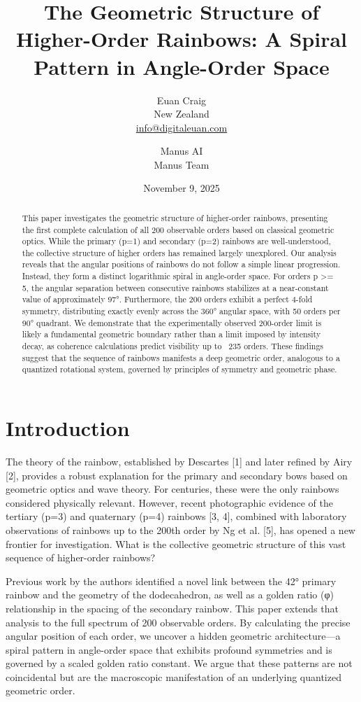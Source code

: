 \documentclass[12pt, twoside]{article}
\title{The Geometric Structure of Higher-Order Rainbows: A Spiral Pattern in Angle-Order Space}
\author{Euan Craig \\ \small{New Zealand} \\ \small{\href{mailto:info@digitaleuan.com}{info@digitaleuan.com}} \and Manus AI \\ \small{Manus Team}}
\date{November 9, 2025}
\begin{document}
\maketitle

\begin{abstract}
This paper investigates the geometric structure of higher-order rainbows, presenting the first complete calculation of all 200 observable orders based on classical geometric optics. While the primary (p=1) and secondary (p=2) rainbows are well-understood, the collective structure of higher orders has remained largely unexplored. Our analysis reveals that the angular positions of rainbows do not follow a simple linear progression. Instead, they form a distinct logarithmic spiral in angle-order space. For orders p >= 5, the angular separation between consecutive rainbows stabilizes at a near-constant value of approximately 97°. Furthermore, the 200 orders exhibit a perfect 4-fold symmetry, distributing exactly evenly across the 360° angular space, with 50 orders per 90° quadrant. We demonstrate that the experimentally observed 200-order limit is likely a fundamental geometric boundary rather than a limit imposed by intensity decay, as coherence calculations predict visibility up to ~235 orders. These findings suggest that the sequence of rainbows manifests a deep geometric order, analogous to a quantized rotational system, governed by principles of symmetry and geometric phase.
\end{abstract}

\section{Introduction}
The theory of the rainbow, established by Descartes [1] and later refined by Airy [2], provides a robust explanation for the primary and secondary bows based on geometric optics and wave theory. For centuries, these were the only rainbows considered physically relevant. However, recent photographic evidence of the tertiary (p=3) and quaternary (p=4) rainbows [3, 4], combined with laboratory observations of rainbows up to the 200th order by Ng et al. [5], has opened a new frontier for investigation. What is the collective geometric structure of this vast sequence of higher-order rainbows?

Previous work by the authors identified a novel link between the 42° primary rainbow and the geometry of the dodecahedron, as well as a golden ratio (φ) relationship in the spacing of the secondary rainbow. This paper extends that analysis to the full spectrum of 200 observable orders. By calculating the precise angular position of each order, we uncover a hidden geometric architecture—a spiral pattern in angle-order space that exhibits profound symmetries and is governed by a scaled golden ratio constant. We argue that these patterns are not coincidental but are the macroscopic manifestation of an underlying quantized geometric order.
\end{document}
